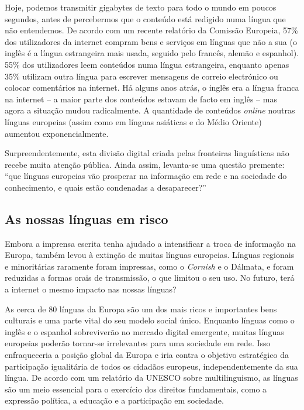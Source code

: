 \begin{multicols}{2}

Hoje, podemos transmitir gigabytes de texto para todo o mundo em poucos segundos, antes de percebermos que o conteúdo está redigido numa língua que não entendemos. De acordo com um recente relatório da Comissão Europeia, 57\% dos utilizadores da internet compram bens e serviços em línguas que não a sua (o inglês é a língua estrangeira mais usada, seguido pelo francês, alemão e espanhol). 55\% dos utilizadores leem conteúdos numa língua estrangeira, enquanto apenas 35\% utilizam outra língua para escrever mensagens de correio electrónico ou colocar comentários na internet\cite{EC1}. Há alguns anos atrás, o inglês era a língua franca na internet – a maior parte dos conteúdos estavam de facto em inglês – mas agora a si\-tua\-ção mudou radicalmente. A quantidade de conteúdos \textit{online} noutras línguas europeias (assim como em línguas asiáticas e do Médio Oriente) aumentou exponencialmente.

Surpreendentemente, esta divisão digital criada pelas fronteiras linguísticas não recebe muita atenção pública. Ainda assim, levanta-se uma questão premente: “que línguas europeias vão prosperar na informação em rede e na sociedade do co\-nhe\-ci\-men\-to, e quais estão condenadas a desaparecer?”

\subsection{As nossas línguas em risco}

 Embora a imprensa escrita tenha ajudado a intensificar a troca de informação na Europa, também levou à extinção de muitas línguas europeias. Línguas regionais e minoritárias raramente foram impressas, como o \textit{Cornish} e o Dálmata, e foram reduzidas a formas orais de transmissão, o que limitou o seu uso. No futuro, terá a internet o mesmo impacto nas nossas línguas?

As cerca de 80 línguas da Europa são um dos mais ricos e importantes bens culturais e uma parte vital do seu modelo social único\cite{EC2}. Enquanto línguas como o inglês e o espanhol sobreviverão no mercado digital emergente, muitas línguas europeias poderão tornar-se irrelevantes para uma sociedade em rede. Isso enfraqueceria a posição global da Europa e iria contra o objetivo estratégico da participação igualitária de todos os cidadãos europeus, independentemente da sua língua. De acordo com um relatório da UNESCO sobre multilinguismo, as línguas são um meio essencial para o exercício dos direitos fundamentais, como a expressão política, a educação e a participação em sociedade\cite{Unesco1}.


\end{multicols}
